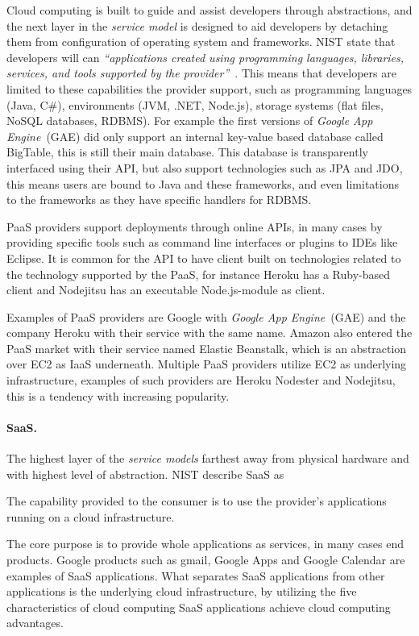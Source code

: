 Cloud computing is built to guide and assist developers through abstractions, and the next
layer in the \emph{service model} is designed to aid developers by detaching them
from configuration of operating system and frameworks.
NIST state that developers will can \emph{``applications created using programming languages, 
libraries, services, and tools supported by the provider''}~\cite{nist:mell11}.
This means that developers are limited to these capabilities the provider support,
such as programming languages (Java, C\#), environments (JVM, .NET, Node.js), 
storage systems (flat files, NoSQL databases, RDBMS).
For example the first versions of \emph{Google App Engine}~(GAE) did only support
an internal key-value based database called BigTable, this is still their main database.
This database is transparently interfaced using their API, but also support technologies such as JPA and JDO,
this means users are bound to Java and these frameworks, and even limitations to the frameworks
as they have specific handlers for RDBMS.

PaaS providers support deployments through online APIs, in many cases by providing 
specific tools such as command line interfaces or plugins to IDEs like Eclipse.
It is common for the API to have client built on technologies related to the technology supported by the PaaS,
for instance Heroku has a Ruby-based client and Nodejitsu has an executable Node.js-module as client.

Examples of PaaS providers are Google with \emph{Google App Engine}~(GAE) and
the company Heroku with their service with the same name.
Amazon also entered the PaaS market with their service named Elastic Beanstalk,
which is an abstraction over EC2 as IaaS underneath.
Multiple PaaS providers utilize EC2 as underlying infrastructure, examples of such
providers are Heroku Nodester and Nodejitsu, this is a tendency with increasing popularity.

\paragraph{SaaS.}

The highest layer of the \emph{service models} farthest away from physical hardware
and with highest level of abstraction.
NIST describe SaaS as
\epigraph{The capability provided to the consumer is to use the provider's 
  applications running on a cloud infrastructure.
}{}

The core purpose is to provide whole applications as services, in many cases end products.
Google products such as gmail, Google Apps and  Google Calendar are examples of 
SaaS applications.
What separates SaaS applications from other applications is the underlying cloud infrastructure,
by utilizing the five characteristics of cloud computing SaaS applications achieve 
cloud computing advantages.

